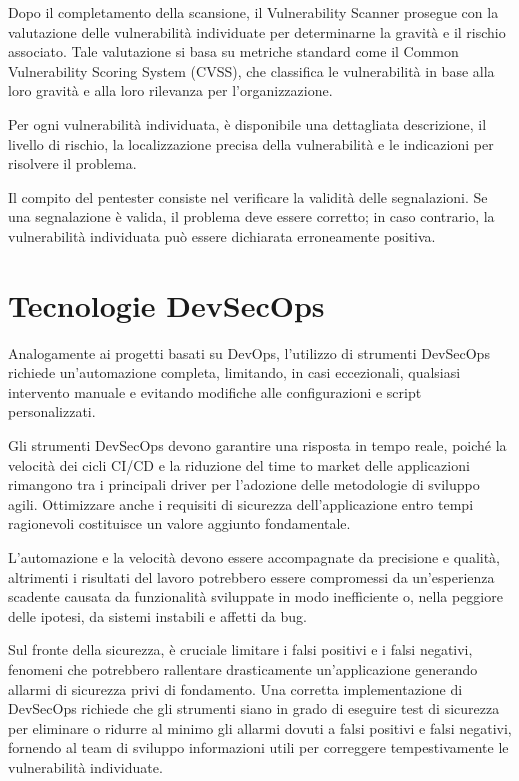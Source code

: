 Dopo il completamento della scansione, il Vulnerability Scanner prosegue con la valutazione delle vulnerabilità individuate per determinarne la gravità e il rischio associato. Tale valutazione si basa su metriche standard come il Common Vulnerability Scoring System (CVSS), che classifica le vulnerabilità in base alla loro gravità e alla loro rilevanza per l'organizzazione.

Per ogni vulnerabilità individuata, è disponibile una dettagliata descrizione, il livello di rischio, la localizzazione precisa della vulnerabilità e le indicazioni per risolvere il problema.

Il compito del pentester consiste nel verificare la validità delle segnalazioni. Se una segnalazione è valida, il problema deve essere corretto; in caso contrario, la vulnerabilità individuata può essere dichiarata erroneamente positiva.
\section{Tecnologie DevSecOps}
Analogamente ai progetti basati su DevOps, l'utilizzo di strumenti DevSecOps richiede un'automazione completa, limitando, in casi eccezionali, qualsiasi intervento manuale e evitando modifiche alle configurazioni e script personalizzati. 

Gli strumenti DevSecOps devono garantire una risposta in tempo reale, poiché la velocità dei cicli CI/CD e la riduzione del time to market delle applicazioni rimangono tra i principali driver per l'adozione delle metodologie di sviluppo agili. Ottimizzare anche i requisiti di sicurezza dell'applicazione entro tempi ragionevoli costituisce un valore aggiunto fondamentale.

L'automazione e la velocità devono essere accompagnate da precisione e qualità, altrimenti i risultati del lavoro potrebbero essere compromessi da un'esperienza scadente causata da funzionalità sviluppate in modo inefficiente o, nella peggiore delle ipotesi, da sistemi instabili e affetti da bug.

Sul fronte della sicurezza, è cruciale limitare i falsi positivi e i falsi negativi, fenomeni che potrebbero rallentare drasticamente un'applicazione generando allarmi di sicurezza privi di fondamento. Una corretta implementazione di DevSecOps richiede che gli strumenti siano in grado di eseguire test di sicurezza per eliminare o ridurre al minimo gli allarmi dovuti a falsi positivi e falsi negativi, fornendo al team di sviluppo informazioni utili per correggere tempestivamente le vulnerabilità individuate.
